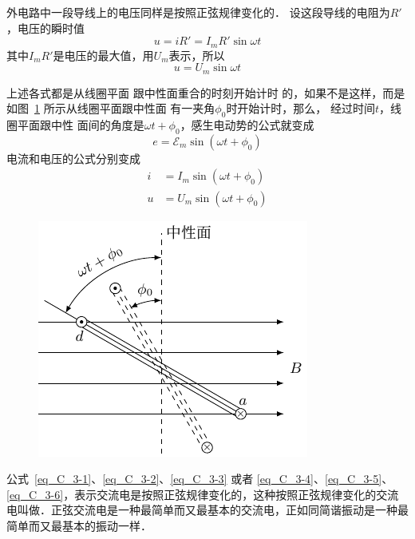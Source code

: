 外电路中一段导线上的电压同样是按照正弦规律变化的．
设这段导线的电阻为$R'$，电压的瞬时值
\[u=iR'=I_mR'\sin\omega t \]
其中$I_mR'$是电压的最大值，用$U_m$表示，所以
\begin{equation}\label{eq_C_3-3}
    u=U_m \sin\omega t
\end{equation}



上述各式都是从线圈平面
跟中性面重合的时刻开始计时
的，如果不是这样，而是如图~\ref{fig_C_3-3} 所示从线圈平面跟中性面
有一夹角$\phi_0$时开始计时，那么，
经过时间$t$，线圈平面跟中性
面间的角度是$\omega t+\phi_0$，感生电动势的公式就变成
\begin{equation}\label{eq_C_3-4}
    e=\mathcal{E}_m \sin (\omega t+\phi_0)
\end{equation}
电流和电压的公式分别变成
\begin{align}
    i&=I_m\sin (\omega t+\phi_0) \label{eq_C_3-5}\\
    u&=U_m\sin (\omega t+\phi_0)\label{eq_C_3-6}
\end{align}

\begin{figure}[htbp]
	\centering
	\includegraphics{fig/C/3-3.pdf}
	\caption{}\label{fig_C_3-3}
\end{figure}


公式~\eqref{eq_C_3-1}、\eqref{eq_C_3-2}、\eqref{eq_C_3-3} 或者 \eqref{eq_C_3-4}、\eqref{eq_C_3-5}、\eqref{eq_C_3-6}，表示交流电是按照正弦规律变化的，这种按照正弦规律变化的交流电叫做．正弦交流电是一种最简单而又最基本的交流电，正如同简谐振动是一种最简单而又最基本的振动一样．
	
